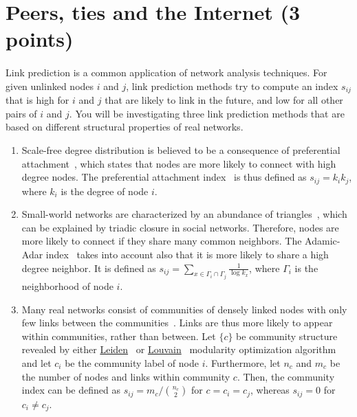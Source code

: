 \documentclass[11pt,a4paper]{article}
\newcommand{\totals}[1]{({\color{magenta}#1 points})}
\begin{document}
\section{Peers, ties and the Internet \totals{3}}

\paragraph{} Link prediction is a common application of network analysis techniques. For given unlinked nodes $i$ and $j$, link prediction methods try to compute an index $s_{ij}$ that is high for $i$ and $j$ that are likely to link in the future, and low for all other pairs of $i$ and $j$. You will be investigating three link prediction methods that are based on different structural properties of real networks.

\begin{enumerate}
	\item Scale-free degree distribution is believed to be a consequence of preferential attachment~\cite{BA99}, which states that nodes are more likely to connect with high degree nodes. The preferential attachment index~\cite{LK07} is thus defined as $s_{ij}=k_ik_j$, where $k_i$ is the degree of node $i$.
	\item Small-world networks are characterized by an abundance of triangles~\cite{WS98}, which can be explained by triadic closure in social networks. Therefore, nodes are more likely to connect if they share many common neighbors. The Adamic-Adar index~\cite{AA03} takes into account also that it is more likely to share a high degree neighbor. It is defined as $s_{ij}=\sum_{x\in \Gamma_i\cap\Gamma_j}\frac{1}{\log k_x}$, where $\Gamma_i$ is the neighborhood of node $i$.
	\item Many real networks consist of communities of densely linked nodes with only few links between the communities~\cite{GN02}. Links are thus more likely to appear within communities, rather than between. Let $\{c\}$ be community structure revealed by either \href{https://github.com/vtraag/leidenalg}{Leiden}~\cite{TWV19} or \href{https://sites.google.com/site/findcommunities/}{Louvain}~\cite{BGLL08} modularity optimization algorithm and let $c_i$ be the community label of node $i$. Furthermore, let $n_c$ and $m_c$ be the number of nodes and links within community $c$. Then, the community index can be defined as $s_{ij}=m_c/{n_c \choose 2}$ for $c=c_i=c_j$, whereas $s_{ij}=0$ for $c_i\neq c_j$.
\end{enumerate}
	
\end{document}
